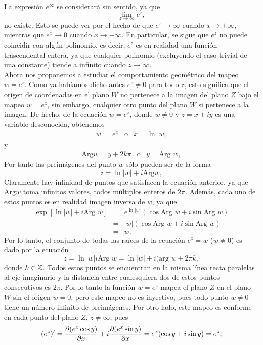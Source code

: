 La expresión $e^{\infty}$ se considerará sin sentido, ya que
$$\lim_{z\to \infty}e^z,$$
no existe. Esto se puede ver por el hecho de que $e^x \to \infty$ cuando $x \to +\infty$,
mientras que $e^x \to 0 $ cuando $x \to -\infty$. En particular, se sigue que $e^z$ no puede coincidir con algún polinomio, es decir, $e^z$ es en realidad una función trascendental entera, ya que cualquier polinomio (excluyendo el caso trivial de una constante) tiende a infinito cuando $z \to \infty$.\\
Ahora nos proponemos a estudiar el comportamiento geométrico del mapeo $w=e^z$. Como ya habíamos dicho antes $e^z\neq0$ para todo $z$, esto significa que el origen de coordenadas en el plano $W$ no pertenece a la imagen del plano $Z$ bajo el mapeo $w=e^z$, sin embargo, cualquier otro punto  del plano $W$ si pertenece a la imagen. De hecho, de la ecuación $w=e^z$, donde $w\neq0$ y $z=x+iy$ es una variable desconocida, obtenemos 
\[
	\begin{array}{ccl}
		|w|=e^x&\mbox{o}&x=\ln |w|,
	\end{array}
\]
y 
\[
\begin{array}{ccl}
	\mbox{Arg}w=y+2k\pi&\mbox{o}&y=\mbox{Arg }w,
\end{array}
\]
Por tanto las preimágenes del punto $w$ sólo pueden ser de la forma
$$z=\ln|w|+i\mbox{Arg}w,$$
Claramente hay infinidad de puntos que satisfacen la ecuación anterior, ya que $\mbox{Arg} w $ toma infinitos valores, todos  múltiplos enteros de $2\pi$. Además, cada uno de estos puntos es en realidad  imagen inversa de $w$, ya que
\[
\begin{array}{ccl}
	\exp[\ln|w|+i\mbox{Arg }w]&=&e^{\ln|w|}(\cos\mbox{Arg }w+i\sin\mbox{Arg }w)\\
	&=&|w|(\cos\mbox{Arg }w+i\sin\mbox{Arg }w)\\
	&=&w.
\end{array}
\]
Por lo tanto, el conjunto de todas las raíces de la ecuación $e^z=w$ ($w\neq 0$) es dado por la ecuación 
$$z=\ln|w|i\mbox{Arg }w=\ln|w|+i(\mbox{arg }w+2\pi k,$$
donde $k\in\mathbb{Z}$. Todos estos puntos se encuentran en la misma línea recta paralelas al eje imaginario  y la distancia entre cualesquiera dos de estos puntos consecutivos  es $2\pi$. Por lo tanto la función $w=e^z$ mapea el plano $Z$ en el plano $W$ sin el origen $w=0$, pero este mapeo no es inyectivo, pues todo punto $w\neq0$ tiene un número infinito de preimágenes. Por otro lado, este mapeo es conforme en cada punto del plano $Z$, $z\neq\infty$, pues 
$$(e^z)'=\dfrac{\partial(e^x\cos y)}{\partial x}+i \dfrac{\partial(e^x\sin y)}{\partial x}=e^{x}(\cos y+i\sin y)=e^z,$$
